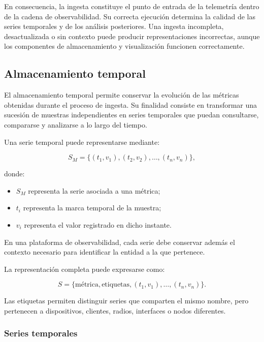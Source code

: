 En consecuencia, la ingesta constituye el punto de entrada de la
telemetría dentro de la cadena de observabilidad. Su correcta ejecución
determina la calidad de las series temporales y de los análisis
posteriores. Una ingesta incompleta, desactualizada o sin contexto puede
producir representaciones incorrectas, aunque los componentes de
almacenamiento y visualización funcionen correctamente.

\subsection{Almacenamiento temporal}
\label{subsec:almacenamiento-temporal}

El almacenamiento temporal permite conservar la evolución de las
métricas obtenidas durante el proceso de ingesta. Su finalidad consiste
en transformar una sucesión de muestras independientes en series
temporales que puedan consultarse, compararse y analizarse a lo largo del
tiempo.

Una serie temporal puede representarse mediante:

\[
    S_M
    =
    \{
        (t_1,v_1),
        (t_2,v_2),
        \ldots,
        (t_n,v_n)
    \},
\]

donde:

\begin{itemize}
    \item \(S_M\) representa la serie asociada a una métrica;

    \item \(t_i\) representa la marca temporal de la muestra;

    \item \(v_i\) representa el valor registrado en dicho instante.
\end{itemize}

En una plataforma de observabilidad, cada serie debe conservar además el
contexto necesario para identificar la entidad a la que pertenece.

La representación completa puede expresarse como:

\[
    S =
    \{
        \text{métrica},
        \text{etiquetas},
        (t_1,v_1),
        \ldots,
        (t_n,v_n)
    \}.
\]

Las etiquetas permiten distinguir series que comparten el mismo nombre,
pero pertenecen a dispositivos, clientes, radios, interfaces o nodos
diferentes.


\subsubsection*{Series temporales}


